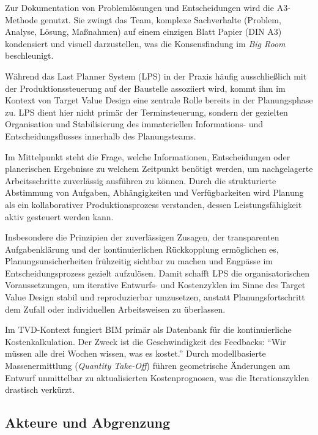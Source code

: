 Zur Dokumentation von Problemlösungen und Entscheidungen wird die A3-Methode genutzt. Sie zwingt das Team, komplexe Sachverhalte (Problem, Analyse, Lösung, Maßnahmen) auf einem einzigen Blatt Papier (DIN A3) kondensiert und visuell darzustellen, was die Konsensfindung im \textit{Big Room} beschleunigt.\autocite[Vgl.][S.~41--43]{hill_target_2017}


Während das Last Planner System (LPS) in der Praxis häufig ausschließlich mit der Produktionssteuerung auf der Baustelle assoziiert wird, kommt ihm im Kontext von Target Value Design eine zentrale Rolle bereits in der Planungsphase zu. LPS dient hier nicht primär der Terminsteuerung, sondern der gezielten Organisation und Stabilisierung des immateriellen Informations- und Entscheidungsflusses innerhalb des Planungsteams.  

Im Mittelpunkt steht die Frage, welche Informationen, Entscheidungen oder planerischen Ergebnisse zu welchem Zeitpunkt benötigt werden, um nachgelagerte Arbeitsschritte zuverlässig ausführen zu können. Durch die strukturierte Abstimmung von Aufgaben, Abhängigkeiten und Verfügbarkeiten wird Planung als ein kollaborativer Produktionsprozess verstanden, dessen Leistungsfähigkeit aktiv gesteuert werden kann.  

Insbesondere die Prinzipien der zuverlässigen Zusagen, der transparenten Aufgabenklärung und der kontinuierlichen Rückkopplung ermöglichen es, Planungsunsicherheiten frühzeitig sichtbar zu machen und Engpässe im Entscheidungsprozess gezielt aufzulösen. Damit schafft LPS die organisatorischen Voraussetzungen, um iterative Entwurfs- und Kostenzyklen im Sinne des Target Value Design stabil und reproduzierbar umzusetzen, anstatt Planungsfortschritt dem Zufall oder individuellen Arbeitsweisen zu überlassen. \autocite[Vgl.][S.~85--90]{ballard_target_2025}\,\autocite[Vgl.][S.~1--4]{ballard_lean_2003}

Im \acs{TVD}-Kontext fungiert \acs{BIM} primär als Datenbank für die kontinuierliche Kostenkalkulation. Der Zweck ist die Geschwindigkeit des Feedbacks: \enquote{Wir müssen alle drei Wochen wissen, was es kostet.} Durch modellbasierte Massenermittlung (\textit{Quantity Take-Off}) führen geometrische Änderungen am Entwurf unmittelbar zu aktualisierten Kostenprognosen, was die Iterationszyklen drastisch verkürzt.\autocite[Vgl.][S.~392--395]{zimina_target_2012}

\subsection{Akteure und Abgrenzung}
\label{sec:2.3.5}

